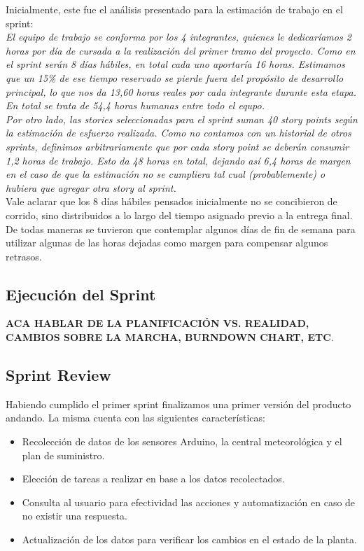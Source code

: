 Inicialmente, este fue el análisis presentado para la estimación de trabajo en el sprint:\\

\indent \textsl{El equipo de trabajo se conforma por los 4 integrantes, quienes le dedicaríamos 2 horas por día de cursada a la realización del primer tramo del proyecto. Como en el sprint serán 8 días hábiles, en total cada uno aportaría 16 horas. Estimamos que un 15\% de ese tiempo reservado se pierde fuera del propósito de desarrollo principal, lo que nos da 13,60 horas reales por cada integrante durante esta etapa. En total se trata de 54,4 horas humanas entre todo el equpo.}\\
\indent \textsl{Por otro lado, las stories seleccionadas para el sprint suman 40 story points según la estimación de esfuerzo realizada. Como no contamos con un historial de otros sprints, definimos arbitrariamente que por cada story point se deberán consumir 1,2 horas de trabajo. Esto da 48 horas en total, dejando así 6,4 horas de margen en el caso de que la estimación no se cumpliera tal cual (probablemente) o hubiera que agregar otra story al sprint.}\\

\indent Vale aclarar que los 8 días hábiles pensados inicialmente no se concibieron de corrido, sino distribuidos a lo largo del tiempo asignado previo a la entrega final. De todas maneras se tuvieron que contemplar algunos días de fin de semana para utilizar algunas de las horas dejadas como margen para compensar algunos retrasos.

\subsection{Ejecución del Sprint}

\textbf{ACA HABLAR DE LA PLANIFICACIÓN VS. REALIDAD, CAMBIOS SOBRE LA MARCHA, BURNDOWN CHART, ETC}.

\subsection{Sprint Review}
Habiendo cumplido el primer sprint finalizamos una primer versión del producto andando. 
La misma cuenta con las siguientes características:
\begin{itemize}
\item Recolección de datos de los sensores Arduino, la central meteorológica y el plan de suministro.
\item Elección de tareas a realizar en base a los datos recolectados.
\item Consulta al usuario para efectividad las acciones y automatización en caso de no existir una respuesta.
\item Actualización de los datos para verificar los cambios en el estado de la planta.
\end{itemize}

